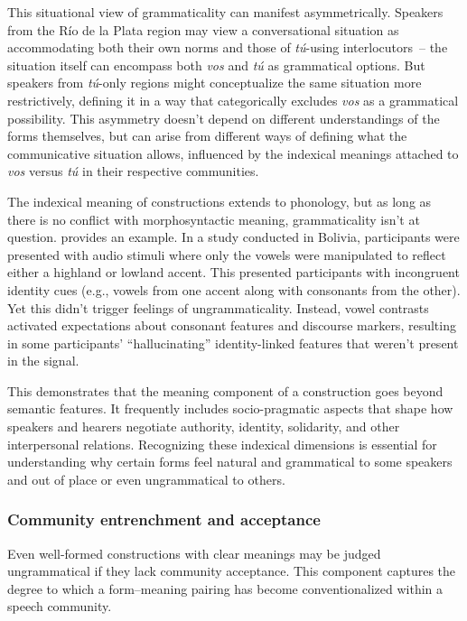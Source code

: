 \documentclass[12pt,letterpaper]{article}
\begin{document}
This situational view of grammaticality can manifest asymmetrically. Speakers from the Río de la Plata region may view a conversational situation as accommodating both their own norms and those of \textit{tú}-using interlocutors~-- the situation itself can encompass both \textit{vos} and \textit{tú} as grammatical options. But speakers from \textit{tú}-only regions might conceptualize the same situation more restrictively, defining it in a way that categorically excludes \textit{vos} as a grammatical possibility. This asymmetry doesn't depend on different understandings of the forms themselves, but can arise from different ways of defining what the communicative situation allows, influenced by the indexical meanings attached to \textit{vos} versus \textit{tú} in their respective communities.

The indexical meaning of constructions extends to phonology, but as long as there is no conflict with morphosyntactic meaning, grammaticality isn't at question. \textcite{Babel2025} provides an example. In a study conducted in Bolivia, participants were presented with audio stimuli where only the vowels were manipulated to reflect either a highland or lowland accent. This presented participants with incongruent identity cues (e.g., vowels from one accent along with consonants from the other). Yet this didn't trigger feelings of ungrammaticality. Instead, vowel contrasts activated expectations about consonant features and discourse markers, resulting in some participants' \enquote{hallucinating} identity-linked features that weren't present in the signal.

This demonstrates that the meaning component of a construction goes beyond semantic features. It frequently includes socio-pragmatic aspects that shape how speakers and hearers negotiate authority, identity, solidarity, and other interpersonal relations. Recognizing these indexical dimensions is essential for understanding why certain forms feel natural and grammatical to some speakers and out of place or even ungrammatical to others.

\subsubsection{Community entrenchment and acceptance}\label{sec:community-acceptance}

Even well-formed constructions with clear meanings may be judged ungrammatical if they lack community acceptance. This component captures the degree to which a form--meaning pairing has become conventionalized within a speech community.
\end{document}
